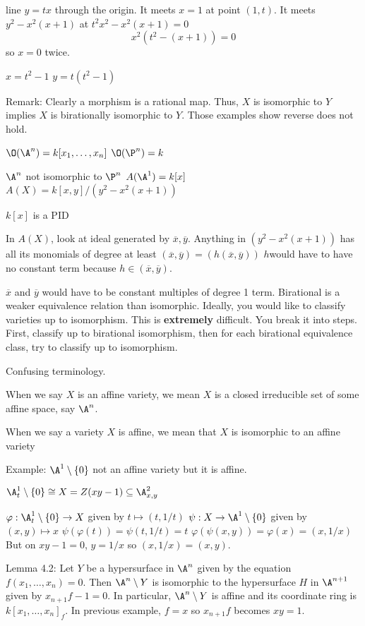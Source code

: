 
line $y=tx$ through the origin. It meets $x=1$ at point $(1,t)$. It meets $y^2-x^2(x+1)$ at $t^2x^2-x^2(x+1)=0$
	\[
	x^2(t^2-(x+1))=0
	\]
so $x=0$ twice.

$x= t^2-1$
$y=t(t^2-1)$

Remark: Clearly a morphism is a rational map. Thus, $X$ is isomorphic to $Y$ implies $X$ is birationally isomorphic to $Y$. Those examples show reverse does not hold.

$\O(\A^n)= k[x_1,\ldots,x_n]$
$\O(\P^n)= k$

$\A^n$ not isomorphic to $\P^n$
$A(\A^1)= k[x]$
$A(X)= k[x,y]/(y^2-x^2(x+1))$

$k[x]$ is a PID

In $A(X)$, look at ideal generated by $\overline{x}, \overline{y}$. Anything in $(y^2 - x^2(x+1))$ has all its monomials of degree at least $(\overline{x},\overline{y})= (h(\overline{x},\overline{y}))$ 
$h$would have to have no constant term because $h \in (\overline{x},\overline{y})$. 

$\overline{x}$ and $\overline{y}$ would have to be constant multiples of degree 1 term. Birational is a weaker equivalence relation than isomorphic. Ideally, you would like to classify varieties up to isomorphism. This is \textbf{extremely} difficult. You break it into steps. First, classify up to birational isomorphism, then for each birational equivalence class, try to classify up to isomorphism. 

Confusing terminology.

When we say $X$ is an affine variety, we mean $X$ is a closed irreducible set of some affine space, say $\A^n$. 

When we say a variety $X$ is affine, we mean that $X$ is isomorphic to an affine variety 


Example: $\A^1 \setminus \{0\}$ not an affine variety but it is affine.

$\A_t^1 \setminus \{0\} \cong X= Z(xy-1) \subseteq \A_{x,y}^2$

$\varphi: \A_t^1 \setminus \{0\} \to X$ given by $t \mapsto (t,1/t)$
$\psi: X \to \A^1 \setminus \{0\}$ given by $(x,y) \mapsto x$
$\psi(\varphi(t))= \psi(t,1/t)= t$
$\varphi(\psi(x,y))= \varphi(x)= (x,1/x)$
But on $xy-1=0$, $y=1/x$ so $(x,1/x)=(x,y)$. 


Lemma 4.2: Let $Y$ be a hypersurface in $\A^n$ given by the equation $f(x_1,\ldots,x_n)= 0$. Then $\A^n \setminus Y$ is isomorphic to the hypersurface $H$ in $\A^{n+1}$ given by $x_{n+1}f - 1= 0$. In particular, $\A^n \setminus Y$ is affine and its coordinate ring is $k[x_1,\ldots,x_n]_f$. In previous example, $f=x$ so $x_{n+1}f$ becomes $xy=1$. 

